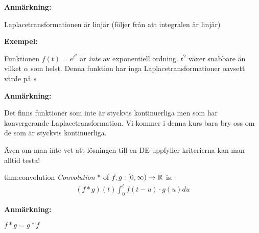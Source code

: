 \par\bigskip
\noindent\textbf{Anmärkning:}\par
\noindent Laplacetransformationen är linjär (följer från att integralen är linjär)
\par\bigskip
\noindent\textbf{Exempel:}\par
\noindent Funktionen $f(t) = e^{t^2}$ är \textit{inte} av exponentiell ordning. $t^2$ växer snabbare än vilket $\alpha$ som helst. Denna funktion har inga Laplacetransformationer oavsett värde på $s$ 
\par\bigskip
\noindent\textbf{Anmärkning:}\par
\noindent Det finns funktioner som inte är styckvis kontinuerliga men som har konvergerande Laplacetransformation. Vi kommer i denna kurs bara bry oss om de som är styckvis kontinuerliga.
\par\bigskip
\noindent Även om man inte vet att lösningen till en DE uppfyller kriterierna kan man alltid testa! 
\par\bigskip
\begin{theo}[Convolution]{thm:convolution}
  \textit{Convolution} * of $f,g:[0,\infty)\to\mathbb{R}$ is:
  \begin{equation*}
    \begin{gathered}
      (f*g)(t)\int_{0}^{t}f(t-u)\cdot g(u)du
    \end{gathered}
  \end{equation*}
\end{theo}
\par\bigskip
\noindent\textbf{Anmärkning:}\par
\noindent $f*g = g*f$
\newpage
